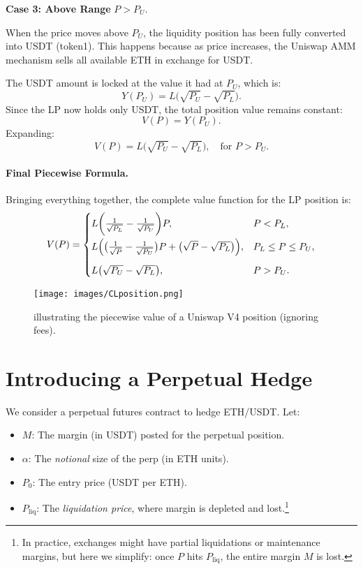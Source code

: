 \documentclass[12pt]{article}
\begin{document}
\medskip

\textbf{Case 3: Above Range} $P > P_U$.

\medskip

When the price moves above $P_U$, the liquidity position has been fully converted into USDT (token1). This happens because as price increases, the Uniswap AMM mechanism sells all available ETH in exchange for USDT.

\medskip

The USDT amount is locked at the value it had at $P_U$, which is:
\[
Y(P_U) = L \bigl(\sqrt{P_U} - \sqrt{P_L}\bigr).
\]
Since the LP now holds only USDT, the total position value remains constant:
\[
V(P) = Y(P_U).
\]
Expanding:
\[
V(P) = L \bigl(\sqrt{P_U} - \sqrt{P_L}\bigr),
\quad \text{for } P > P_U.
\]

\medskip

\paragraph{Final Piecewise Formula.}
Bringing everything together, the complete value function for the LP position is:
\[
V(P) =
\begin{cases}
L \biggl(\frac{1}{\sqrt{P_L}} - \frac{1}{\sqrt{P_U}}\biggr) P, & P < P_L,\\[8pt]
L \Bigl(\bigl(\tfrac{1}{\sqrt{P}} - \tfrac{1}{\sqrt{P_U}}\bigr) P + \bigl(\sqrt{P} - \sqrt{P_L}\bigr)\Bigr), & P_L \le P \le P_U,\\[10pt]
L \bigl(\sqrt{P_U} - \sqrt{P_L}\bigr), & P > P_U.
\end{cases}
\]

\begin{figure}[htb]
    \centering
    \texttt{[image: images/CLposition.png]}
    \caption{illustrating the piecewise value of a Uniswap V4 position (ignoring fees).}
    \label{fig:CLposition}
\end{figure}

\newpage

\section{Introducing a Perpetual Hedge}
\label{sec:perphedge}

We consider a perpetual futures contract to hedge ETH/USDT. Let:
\begin{itemize}
    \item $M$: The margin (in USDT) posted for the perpetual position.
    \item $\alpha$: The \emph{notional} size of the perp (in ETH units).
    \item $P_0$: The entry price (USDT per ETH).
    \item $P_{\mathrm{liq}}$: The \emph{liquidation price}, where margin is depleted and lost.\footnote{
      In practice, exchanges might have partial liquidations or maintenance margins, but here we simplify: once $P$ hits $P_{\mathrm{liq}}$, the entire margin $M$ is lost.}
\end{itemize}
\end{document}

